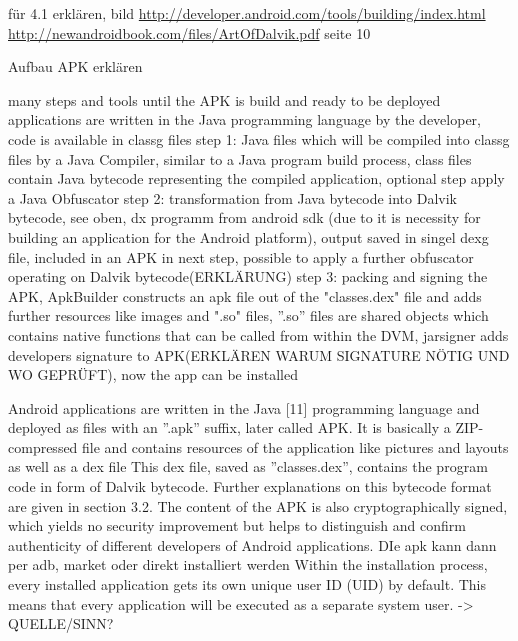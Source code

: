 \cite{kovachevaMaster} \cite{ehringerDalvik}
%

für 4.1 erklären, bild
\url{http://developer.android.com/tools/building/index.html} \url{http://newandroidbook.com/files/ArtOfDalvik.pdf} seite 10\newline

Aufbau APK erklären\newline

many steps and tools until the APK is build and ready to be deployed\newline
applications are written in the Java programming language by the developer, code is available in \gls{classg} files\newline
step 1:  Java files which will be compiled into \gls{classg} files by a Java Compiler,  similar to a Java program build process, class files contain Java bytecode representing the compiled application, optional step apply a Java Obfuscator\newline
step 2: transformation from Java bytecode into Dalvik bytecode, see oben, dx programm from android sdk (due to it is necessity for building an application for the Android platform), output saved in singel \gls{dexg} file, included in an APK in next step, possible to apply a further obfuscator operating
on Dalvik bytecode(ERKLÄRUNG)\newline
step 3: packing and signing the APK, ApkBuilder constructs an apk file out of the "classes.dex" file and adds further resources like images and ".so" files, ”.so” files are shared objects which contains native functions that can be called from within the DVM, jarsigner adds developers signature to APK(ERKLÄREN WARUM SIGNATURE NÖTIG UND WO GEPRÜFT), now the app can be installed



Android applications are written in the Java [11] programming language and deployed as files with an ”.apk” suffix, later called APK. It is basically a ZIP-compressed file and contains resources of the application like pictures and layouts as well as a dex file\newline
This dex file, saved as ”classes.dex”, contains the program code in form of Dalvik bytecode. Further explanations on this bytecode format are given in section 3.2. The content of the APK is also cryptographically signed, which yields no security improvement but helps to distinguish and confirm authenticity of different developers of Android applications.\newline
DIe apk kann dann per adb, market oder direkt installiert werden\newline
Within the installation process, every installed application gets its own unique user ID (UID) by default. This means that every application will be executed as a separate system user. -> QUELLE/SINN?\newline
